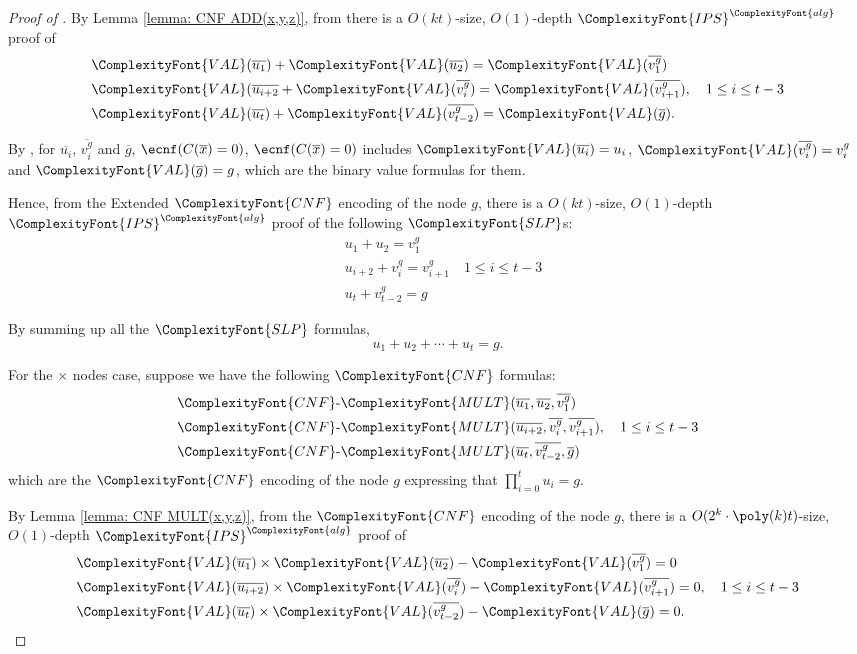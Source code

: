 \documentclass[11pt,letter]{article}
\theoremstyle{remark} %
\newcommand{\alg}{\ComplexityFont{alg}}
\newcommand{\IPS}{%
    {
        \ComplexityFont{IPS} 
    }
}
\newcommand{\CNF}{ %
    {
        \ComplexityFont{CNF}
    }
}
\newcommand{\VAL}{ %
    {
        \ComplexityFont{VAL}
    }
}
\newcommand{\mult}{ %
    {
        \ComplexityFont{MULT}
    }
}
\newcommand{\SLP}{ %
    {
        \ComplexityFont{SLP}
    }
}
\begin{document}
{\begin{proof}[Proof of ]
        By Lemma \ref{lemma: CNF ADD(x,y,z)}, from 
        there is a $O(k t)$-size, $O(1)$-depth $\IPS^\alg$ proof of
        \begin{align*}
            &\VAL(\overline{u_1}) + \VAL(\overline{u_2}) = \VAL(\overline{v_1^g}) \\
            &\VAL(\overline{u_{i+2}} + \VAL(\overline{v_i^g}) = \VAL(\overline{v_{i+1}^g}), \quad 1 \leq i \leq t-3 \\
            &\VAL(\overline{u_t}) + \VAL(\overline{v_{t-2}^g}) = \VAL(\overline{g}).
        \end{align*}

        By , for $\overline{u_i}$, $\overline{v_i^g}$ and $\overline{g}$, $\ecnf(C(\overline{x}) =0)$, $\ecnf(C(\overline{x})=0)$ includes $\VAL(\overline{u_i}) =u_i$, $\VAL(\overline{v_i^g}) = v_i^g$ and $\VAL(\overline{g})= g$, which are the binary value formulas for them. 

        Hence, from the Extended $\CNF$ encoding of the node $g$, there is a $O(k t)$-size, $O(1)$-depth $\IPS^\alg$ proof of the following $\SLP$s:
        \begin{align*}
            &u_1 + u_2 = v_1^g \\
            &u_{i+2} + v_i^g = v_{i+1}^g \quad 1 \leq i \leq t-3 \\
            &u_t + v_{t-2}^g = g
        \end{align*}

        By summing up all the $\SLP$ formulas, 
        \[
            u_1 + u_2 +\cdots + u_t = g.
        \]
        
        
        For the $\times$ nodes case, suppose we have the following $\CNF$ formulas:
        \begin{align*}
            &\CNF\text{-}\mult(\overline{u_1}, \overline{u_2}, \overline{v_1^g}) \\
            &\CNF\text{-}\mult(\overline{u_{i+2}}, \overline{v_i^g}, \overline{v_{i+1}^g}), \quad 1 \leq i \leq t-3\\
            &\CNF\text{-}\mult(\overline{u_t}, \overline{v_{t-2}^g}, \overline{g})
        \end{align*}
        which are the $\CNF$ encoding of the node $g$ expressing that $\prod_{i=0}^t u_i = g$.

        By Lemma \ref{lemma: CNF MULT(x,y,z)}, from the $\CNF$ encoding of the node $g$, there is a $O(2^k \cdot \poly(k) t)$-size, $O(1)$-depth $\IPS^\alg$ proof of
        \begin{align*}
            & \VAL(\overline{u_1}) \times \VAL(\overline{u_2}) - \VAL(\overline{v_1^g}) = 0 \\
            & \VAL(\overline{u_{i+2}}) \times \VAL(\overline{v_i^g}) - \VAL(\overline{v_{i+1}^g}) = 0, \quad 1 \leq i \leq t-3 \\
            & \VAL(\overline{u_t}) \times \VAL(\overline{v_{t-2}^g}) -  \VAL(\overline{g}) = 0.
        \end{align*}


\end{proof}}
\end{document}
